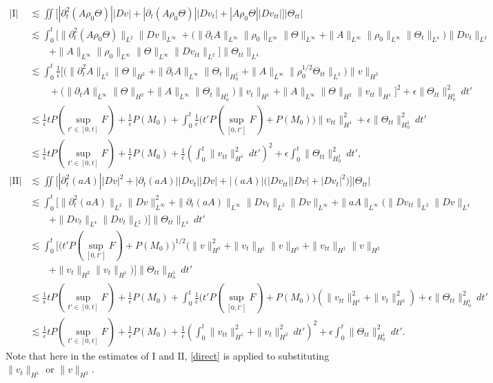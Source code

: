\documentclass[12pt,a4paper]{amsart}
\numberwithin{equation}{section}
\theoremstyle{plain}
\theoremstyle{definition}
\begin{document}
\begin{align*}
|\mathrm{I}|&\lesssim \iint \Big[ |\partial_t^2 (A\rho_0 \Theta)| |Dv|+|\partial_t (A\rho_0 \Theta)| |Dv_t|+ |A\rho_0\Theta| |Dv_{tt}| \Big] |\Theta_{tt}|\\
&\lesssim \int_{0}^{t} \Big[ \|\partial_t^2 (A\rho_0 \Theta)\|_{L^2} \|Dv\|_{L^{\infty}}
+\Big(\|\partial_t A\|_{L^{\infty}}\|\rho_0\|_{L^{\infty}}\|\Theta\|_{L^\infty}
+\|A\|_{L^{\infty}}\|\rho_0\|_{L^{\infty}}\|\Theta_t\|_{L^4}\Big) 
\|Dv_t\|_{L^2}\\
&\qquad
+\|A\|_{L^{\infty}} \|\rho_0\|_{L^{\infty}}\|\Theta\|_{L^{\infty}} \|Dv_{tt}\|_{L^2} \Big]\|\Theta_{tt}\|_{L^4}\\
&\lesssim \int_{0}^{t} \frac{1}{\epsilon}\bigg[ \Big( \|\partial_t^2 A\|_{L^2}\|\Theta\|_{H^2}+\|\partial_t A\|_{L^{\infty}}\|\Theta_t\|_{H_0^1}+ \|A\|_{L^{\infty}}\|\rho_0^{1/2}\Theta_{tt}\|_{L^2} \Big) \|v\|_{H^3}\\
&\qquad
+ \Big(\|\partial_t A\|_{L^{\infty}}\|\Theta\|_{H^2}
+\|A\|_{L^{\infty}}\|\Theta_t\|_{H_0^1}\Big)\|v_t\|_{H^1}
+\|A\|_{L^{\infty}}\|\Theta\|_{H^2}\|v_{tt}\|_{H^1}\bigg]^2+\epsilon\|\Theta_{tt}\|_{H_0^1}^2\ dt'\\
&\lesssim  \frac{1}{\epsilon}tP(\sup\limits_{t'\in[0,t]}F)+\frac{1}{\epsilon}P(M_0)+\int_{0}^{t}\frac{1}{\epsilon}\Big( t'P(\sup\limits_{[0,t']}F)+P(M_0)  \Big) \|v_{tt}\|_{H^1}^2+\epsilon \|\Theta_{tt}\|_{H_0^1}^2\ dt'\\
&\lesssim  \frac{1}{\epsilon}tP(\sup\limits_{t'\in[0,t]}F)+\frac{1}{\epsilon}P(M_0)+\frac{1}{\epsilon}\left(\int_{0}^{t}\|v_{tt}\|_{H^1}^2 \ dt'\right)^2+\epsilon \int_{0}^{t}\|\Theta_{tt}\|_{H_0^1}^2\ dt',\\
|\mathrm{II}|&\lesssim \iint \Big[ |\partial_t^2 (aA)| |Dv|^2 + |\partial_t (aA)| |Dv_t| |Dv|+ |(aA)|\Big( |Dv_{tt}||Dv|+|Dv_t|^2\Big)    \Big] |\Theta_{tt}|\\
&\lesssim \int_{0}^{t} \Big[ \|\partial_t^2 (aA)\|_{L^2} \|Dv\|_{L^{\infty}}^2 + \|\partial_t (aA)\|_{L^{\infty}} \|Dv_t\|_{L^2} \|Dv\|_{L^{\infty}}+ \|aA\|_{L^{\infty}}\Big(\|Dv_{tt}\|_{L^2}\|Dv\|_{L^4}\\
&\qquad
+\|Dv_t\|_{L^4}\|Dv_t\|_{L^2}\Big)    \Big] \|\Theta_{tt}\|_{L^4} \ dt'\\
&\lesssim \int_{0}^{t} \Big[ \Big( t'P(\sup\limits_{[0,t']}F)+P(M_0)  \Big)^{1/2}
  \Big(\|v\|_{H^3}^2+ \|v_t\|_{H^1} \|v\|_{H^3}+\|v_{tt}\|_{H^1}\|v\|_{H^2}
  \\
&\qquad+\|v_t\|_{H^2}\|v_t\|_{H^1}\Big)  \Big] \|\Theta_{tt}\|_{H_0^1} \ dt'\\
&\lesssim  \frac{1}{\epsilon}tP(\sup\limits_{t'\in[0,t]}F)+\frac{1}{\epsilon}P(M_0)
+\int_{0}^{t}\frac{1}{\epsilon}\Big( t'P(\sup\limits_{[0,t']}F)+P(M_0) \Big) (\|v_{tt}\|_{H^1}^2+\|v_t\|_{H^2}^2)+\epsilon \|\Theta_{tt}\|_{H_0^1}^2\ dt'\\
&\lesssim \frac{1}{\epsilon}tP(\sup\limits_{t'\in[0,t]}F)+\frac{1}{\epsilon}P(M_0)
+\frac{1}{\epsilon}\left(\int_{0}^{t}\|v_{tt}\|_{H^1}^2+\|v_t\|_{H^2}^2 \ dt'\right)^2
+\epsilon \int_{0}^{t}\|\Theta_{tt}\|_{H_0^1}^2\ dt'.
\end{align*}
Note that here in the estimates of $\mathrm{I}$ and $\mathrm{II}$, \eqref{direct} is applied to substituting $\|v_t\|_{H^1}$ or $\|v\|_{H^2}$.
\end{document}
